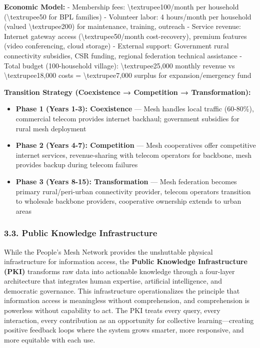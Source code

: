 \textbf{Economic Model:} - Membership fees:
\textbackslash textrupee100/month per household
(\textbackslash textrupee50 for BPL families) - Volunteer labor: 4
hours/month per household (valued \textbackslash textrupee200) for
maintenance, training, outreach - Service revenue: Internet gateway
access (\textbackslash textrupee50/month cost-recovery), premium
features (video conferencing, cloud storage) - External support:
Government rural connectivity subsidies, CSR funding, regional
federation technical assistance - Total budget (100-household village):
\textbackslash textrupee25,000 monthly revenue vs
\textbackslash textrupee18,000 costs = \textbackslash textrupee7,000
surplus for expansion/emergency fund

\textbf{Transition Strategy (Coexistence → Competition →
Transformation):}

\begin{itemize}
\tightlist
\item
  \textbf{Phase 1 (Years 1-3): Coexistence} --- Mesh handles local
  traffic (60-80\%), commercial telecom provides internet backhaul;
  government subsidies for rural mesh deployment
\item
  \textbf{Phase 2 (Years 4-7): Competition} --- Mesh cooperatives offer
  competitive internet services, revenue-sharing with telecom operators
  for backbone, mesh provides backup during telecom failures
\item
  \textbf{Phase 3 (Years 8-15): Transformation} --- Mesh federation
  becomes primary rural/peri-urban connectivity provider, telecom
  operators transition to wholesale backbone providers, cooperative
  ownership extends to urban areas
\end{itemize}

\subsubsection{3.3. Public Knowledge
Infrastructure}\label{public-knowledge-infrastructure}

While the People's Mesh Network provides the unshuttable physical
infrastructure for information access, the \textbf{Public Knowledge
Infrastructure (PKI)} transforms raw data into actionable knowledge
through a four-layer architecture that integrates human expertise,
artificial intelligence, and democratic governance. This infrastructure
operationalizes the principle that information access is meaningless
without comprehension, and comprehension is powerless without capability
to act. The PKI treats every query, every interaction, every
contribution as an opportunity for collective learning---creating
positive feedback loops where the system grows smarter, more responsive,
and more equitable with each use.

